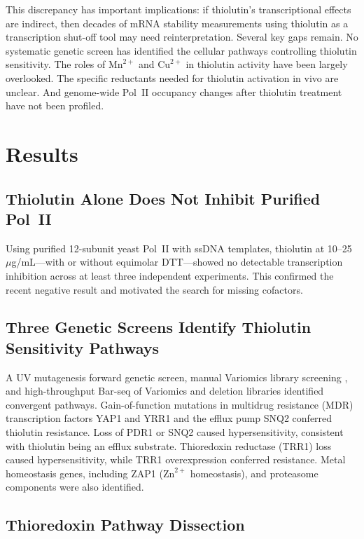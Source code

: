 \documentclass[11pt]{article}
\begin{document}
This discrepancy has important implications: if thiolutin's transcriptional effects are indirect, then decades of mRNA stability measurements using thiolutin as a transcription shut-off tool may need reinterpretation. Several key gaps remain. No systematic genetic screen has identified the cellular pathways controlling thiolutin sensitivity. The roles of $\text{Mn}^{2+}$ and $\text{Cu}^{2+}$ in thiolutin activity have been largely overlooked. The specific reductants needed for thiolutin activation in vivo are unclear. And genome-wide Pol~II occupancy changes after thiolutin treatment have not been profiled.

\section{Results}

\subsection{Thiolutin Alone Does Not Inhibit Purified Pol~II}

Using purified 12-subunit yeast Pol~II with ssDNA templates, thiolutin at 10--25 $\mu$g/mL---with or without equimolar DTT---showed no detectable transcription inhibition across at least three independent experiments. This confirmed the recent negative result and motivated the search for missing cofactors.

\subsection{Three Genetic Screens Identify Thiolutin Sensitivity Pathways}

A UV mutagenesis forward genetic screen, manual Variomics library screening \citep{slusarczyk2023variomics}, and high-throughput Bar-seq of Variomics and deletion libraries identified convergent pathways. Gain-of-function mutations in multidrug resistance (MDR) transcription factors YAP1 and YRR1 and the efflux pump SNQ2 conferred thiolutin resistance. Loss of PDR1 or SNQ2 caused hypersensitivity, consistent with thiolutin being an efflux substrate. Thioredoxin reductase (TRR1) loss caused hypersensitivity, while TRR1 overexpression conferred resistance. Metal homeostasis genes, including ZAP1 ($\text{Zn}^{2+}$ homeostasis), and proteasome components were also identified.

\subsection{Thioredoxin Pathway Dissection}
\end{document}
